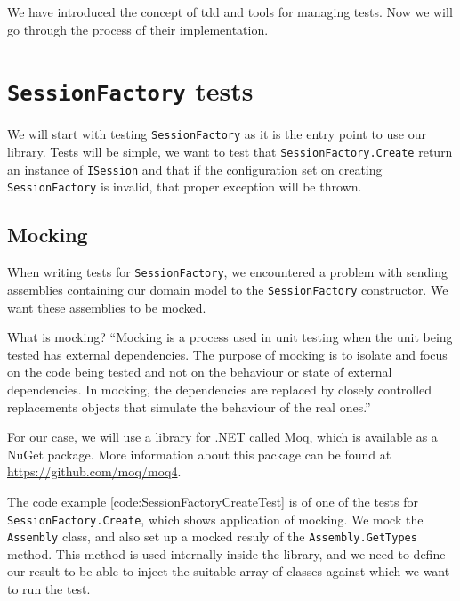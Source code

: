 We have introduced the concept of \acrshort{tdd} and tools for managing tests.
Now we will go through the process of their implementation.

\section{\texttt{SessionFactory} tests}

We will start with testing \texttt{SessionFactory} as it is the entry point to use our library. Tests will be simple,
we want to test that \texttt{SessionFactory.Create} return an instance of \texttt{ISession} and that if the configuration
set on creating \texttt{SessionFactory} is invalid, that proper exception will be thrown.

\subsection{Mocking}

When writing tests for \texttt{SessionFactory}, we encountered a problem with sending assemblies containing our domain model to the \texttt{SessionFactory} constructor.
We want these assemblies to be mocked.

What is mocking? ``Mocking is a process used in unit testing when the unit being tested has external dependencies.
The purpose of mocking is to isolate and focus on the code being tested and not on the behaviour or state of external dependencies.
In mocking, the dependencies are replaced by closely controlled replacements objects that simulate the behaviour of the real ones.'' \cite{progress_software_corporation_mocking_nodate}

For our case, we will use a library for .NET called Moq, which is available as a NuGet package.
More information about this package can be found at \url{https://github.com/moq/moq4}.

The code example \ref{code:SessionFactoryCreateTest} is of one of the tests for \texttt{SessionFactory.Create}, which shows application of mocking.
We mock the \texttt{Assembly} class, and also set up a mocked resuly of the \texttt{Assembly.GetTypes} method.
This method is used internally inside the library, and we need to define our result to be able to inject the suitable array of classes against which we want to run the test.

